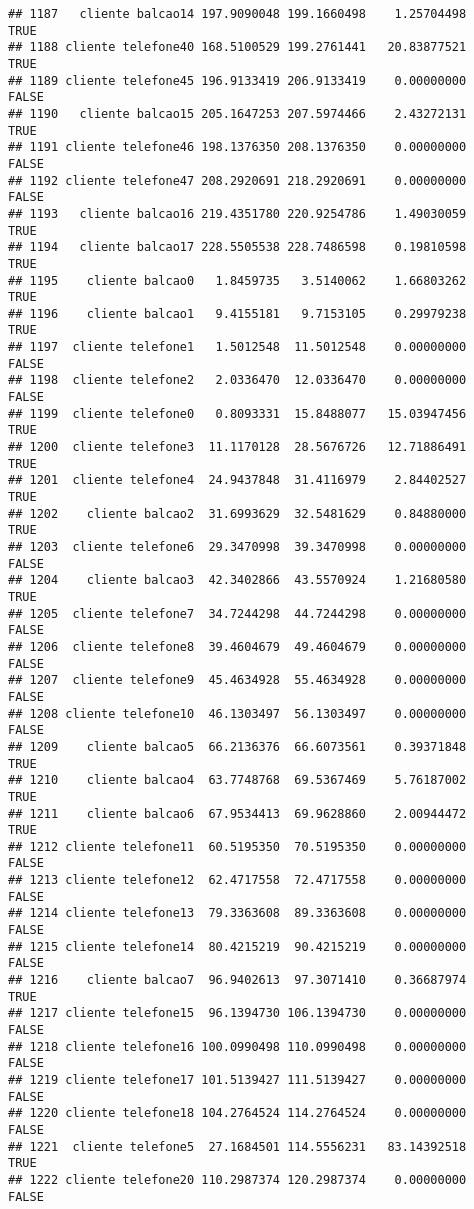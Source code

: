\documentclass[
]{article}
\begin{document}
\begin{verbatim}
## 1187   cliente balcao14 197.9090048 199.1660498    1.25704498     TRUE
## 1188 cliente telefone40 168.5100529 199.2761441   20.83877521     TRUE
## 1189 cliente telefone45 196.9133419 206.9133419    0.00000000    FALSE
## 1190   cliente balcao15 205.1647253 207.5974466    2.43272131     TRUE
## 1191 cliente telefone46 198.1376350 208.1376350    0.00000000    FALSE
## 1192 cliente telefone47 208.2920691 218.2920691    0.00000000    FALSE
## 1193   cliente balcao16 219.4351780 220.9254786    1.49030059     TRUE
## 1194   cliente balcao17 228.5505538 228.7486598    0.19810598     TRUE
## 1195    cliente balcao0   1.8459735   3.5140062    1.66803262     TRUE
## 1196    cliente balcao1   9.4155181   9.7153105    0.29979238     TRUE
## 1197  cliente telefone1   1.5012548  11.5012548    0.00000000    FALSE
## 1198  cliente telefone2   2.0336470  12.0336470    0.00000000    FALSE
## 1199  cliente telefone0   0.8093331  15.8488077   15.03947456     TRUE
## 1200  cliente telefone3  11.1170128  28.5676726   12.71886491     TRUE
## 1201  cliente telefone4  24.9437848  31.4116979    2.84402527     TRUE
## 1202    cliente balcao2  31.6993629  32.5481629    0.84880000     TRUE
## 1203  cliente telefone6  29.3470998  39.3470998    0.00000000    FALSE
## 1204    cliente balcao3  42.3402866  43.5570924    1.21680580     TRUE
## 1205  cliente telefone7  34.7244298  44.7244298    0.00000000    FALSE
## 1206  cliente telefone8  39.4604679  49.4604679    0.00000000    FALSE
## 1207  cliente telefone9  45.4634928  55.4634928    0.00000000    FALSE
## 1208 cliente telefone10  46.1303497  56.1303497    0.00000000    FALSE
## 1209    cliente balcao5  66.2136376  66.6073561    0.39371848     TRUE
## 1210    cliente balcao4  63.7748768  69.5367469    5.76187002     TRUE
## 1211    cliente balcao6  67.9534413  69.9628860    2.00944472     TRUE
## 1212 cliente telefone11  60.5195350  70.5195350    0.00000000    FALSE
## 1213 cliente telefone12  62.4717558  72.4717558    0.00000000    FALSE
## 1214 cliente telefone13  79.3363608  89.3363608    0.00000000    FALSE
## 1215 cliente telefone14  80.4215219  90.4215219    0.00000000    FALSE
## 1216    cliente balcao7  96.9402613  97.3071410    0.36687974     TRUE
## 1217 cliente telefone15  96.1394730 106.1394730    0.00000000    FALSE
## 1218 cliente telefone16 100.0990498 110.0990498    0.00000000    FALSE
## 1219 cliente telefone17 101.5139427 111.5139427    0.00000000    FALSE
## 1220 cliente telefone18 104.2764524 114.2764524    0.00000000    FALSE
## 1221  cliente telefone5  27.1684501 114.5556231   83.14392518     TRUE
## 1222 cliente telefone20 110.2987374 120.2987374    0.00000000    FALSE

\end{verbatim}
\end{document}
